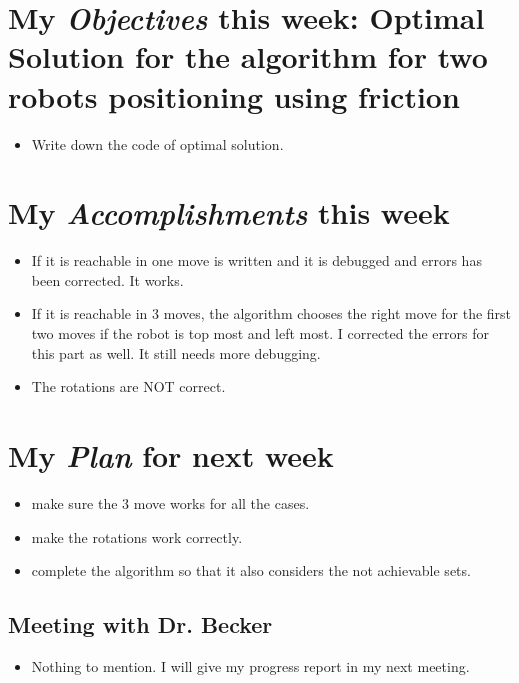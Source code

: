 \newcommand{\handoutName}{Weekly report}
\newcommand{\handoutdate}{\today}


\section{My \emph{Objectives} this week: Optimal Solution for the algorithm for two robots positioning using friction}
\begin{itemize}
\item Write down the code of optimal solution.
\end{itemize}



\section{My \emph{Accomplishments} this week}


\begin{itemize}
\item If it is reachable in one move is written and it is debugged and errors has been corrected. It works.
\item If it is reachable in 3 moves, the algorithm chooses the right move for the first two moves if the robot is top most and left most. I corrected the errors for this part as well. It still needs more debugging.
\item The rotations are NOT correct.
\end{itemize}


\section{My \emph{Plan} for next week}

\begin{itemize}
\item make sure the 3 move works for all the cases.
\item make the rotations work correctly.
\item complete the algorithm so that it also considers the not achievable sets.
\end{itemize}

\subsection{Meeting with Dr. Becker  }

\begin{itemize}
\item Nothing to mention. I will give my progress report in my next meeting. 
\end{itemize}


